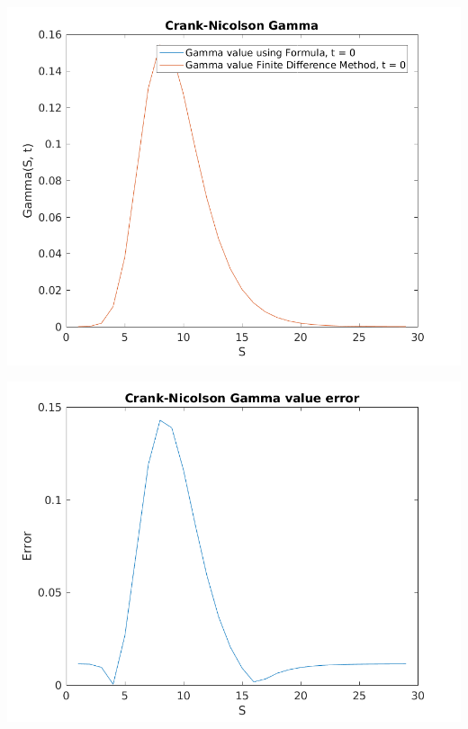 \documentclass{article}
\begin{document}
\includegraphics{"q2_28"}
\pagebreak


\includegraphics{"q2_29"}
\pagebreak
\end{document}
